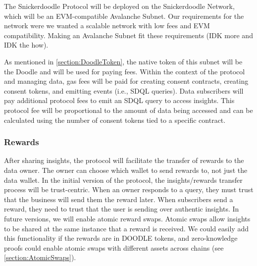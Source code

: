 The Snickerdoodle Protocol will be deployed on the Snickerdoodle Network, which will be an EVM-compatible Avalanche Subnet. Our requirements for the network were we wanted a scalable network with low fees and EVM compatibility. Making an Avalanche Subnet fit these requirements (IDK more and IDK the how).

As mentioned in \ref{section:DoodleToken}, the native token of this subnet will be the Doodle and will be used for paying fees. Within the context of the protocol and managing data, gas fees will be paid for creating consent contracts, creating consent tokens, and emitting events (i.e., SDQL queries). Data subscribers will pay additional protocol fees to emit an SDQL query to access insights. This protocol fee will be proportional to the amount of data being accessed and can be calculated using the number of consent tokens tied to a specific contract.

\subsubsection{Rewards}
After sharing insights, the protocol will facilitate the transfer of rewards to the data owner. The owner can choose which wallet to send rewards to, not just the data wallet. In the initial version of the protocol, the insights/rewards transfer process will be trust-centric. When an owner responds to a query, they must trust that the business will send them the reward later. When subscribers send a reward, they need to trust that the user is sending over authentic insights. In future versions, we will enable atomic reward swaps. Atomic swaps allow insights to be shared at the same instance that a reward is received. We could easily add this functionality if the rewards are in DOODLE tokens, and zero-knowledge proofs could enable atomic swaps with different assets across chains (see \ref{section:AtomicSwaps}).

